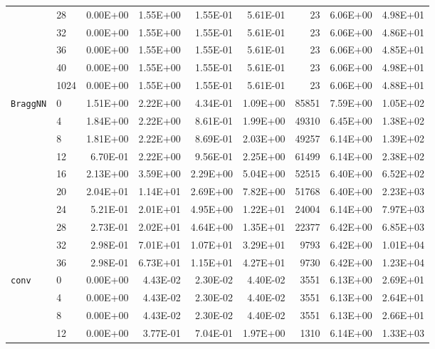 \begin{longtable}{llrrrrrrr}
         & 28   &   0.00E+00 & 1.55E+00 & 1.55E-01 & 5.61E-01 &      23 &     6.06E+00 & 4.98E+01 \\
         & 32   &   0.00E+00 & 1.55E+00 & 1.55E-01 & 5.61E-01 &      23 &     6.06E+00 & 4.86E+01 \\
         & 36   &   0.00E+00 & 1.55E+00 & 1.55E-01 & 5.61E-01 &      23 &     6.06E+00 & 4.85E+01 \\
         & 40   &   0.00E+00 & 1.55E+00 & 1.55E-01 & 5.61E-01 &      23 &     6.06E+00 & 4.98E+01 \\
         & 1024 &   0.00E+00 & 1.55E+00 & 1.55E-01 & 5.61E-01 &      23 &     6.06E+00 & 4.88E+01 \\
\texttt{BraggNN} & 0    &   1.51E+00 & 2.22E+00 & 4.34E-01 & 1.09E+00 &   85851 &     7.59E+00 & 1.05E+02 \\
         & 4    &   1.84E+00 & 2.22E+00 & 8.61E-01 & 1.99E+00 &   49310 &     6.45E+00 & 1.38E+02 \\
         & 8    &   1.81E+00 & 2.22E+00 & 8.69E-01 & 2.03E+00 &   49257 &     6.14E+00 & 1.39E+02 \\
         & 12   &   6.70E-01 & 2.22E+00 & 9.56E-01 & 2.25E+00 &   61499 &     6.14E+00 & 2.38E+02 \\
         & 16   &   2.13E+00 & 3.59E+00 & 2.29E+00 & 5.04E+00 &   52515 &     6.40E+00 & 6.52E+02 \\
         & 20   &   2.04E+01 & 1.14E+01 & 2.69E+00 & 7.82E+00 &   51768 &     6.40E+00 & 2.23E+03 \\
         & 24   &   5.21E-01 & 2.01E+01 & 4.95E+00 & 1.22E+01 &   24004 &     6.14E+00 & 7.97E+03 \\
         & 28   &   2.73E-01 & 2.02E+01 & 4.64E+00 & 1.35E+01 &   22377 &     6.42E+00 & 6.85E+03 \\
         & 32   &   2.98E-01 & 7.01E+01 & 1.07E+01 & 3.29E+01 &    9793 &     6.42E+00 & 1.01E+04 \\
         & 36   &   2.98E-01 & 6.73E+01 & 1.15E+01 & 4.27E+01 &    9730 &     6.42E+00 & 1.23E+04 \\
\texttt{conv} & 0    &   0.00E+00 & 4.43E-02 & 2.30E-02 & 4.40E-02 &    3551 &     6.13E+00 & 2.69E+01 \\
         & 4    &   0.00E+00 & 4.43E-02 & 2.30E-02 & 4.40E-02 &    3551 &     6.13E+00 & 2.64E+01 \\
         & 8    &   0.00E+00 & 4.43E-02 & 2.30E-02 & 4.40E-02 &    3551 &     6.13E+00 & 2.66E+01 \\
         & 12   &   0.00E+00 & 3.77E-01 & 7.04E-01 & 1.97E+00 &    1310 &     6.14E+00 & 1.33E+03 \\

\end{longtable}
